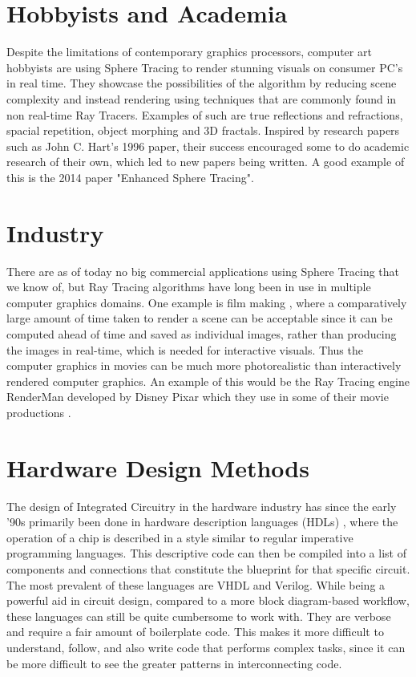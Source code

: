 	\section{ Hobbyists and Academia }

		Despite the limitations of contemporary graphics processors, computer art
		hobbyists are using Sphere Tracing to render stunning visuals on consumer
		PC's in real time. They showcase the possibilities of the algorithm by
		reducing scene complexity and instead rendering using techniques that are
		commonly found in non real-time Ray Tracers. Examples of such are true
		reflections and refractions, spacial repetition, object morphing and 3D
		fractals\cite{InigoQuilez}. Inspired by research papers such as John C.
		Hart's 1996 paper\cite{Hart1996}, their success encouraged some to do
		academic research of their own, which led to new papers being written. A
		good example of this is the 2014 paper "Enhanced Sphere
		Tracing"\cite{Korndorfer2014}.

	\section{ Industry }		

		There are as of today no big commercial applications using Sphere
		Tracing that we know of, but Ray Tracing algorithms have long been in
		use in multiple computer graphics domains. One example is film
		making \cite{Christensen2006}, where a comparatively large amount of
		time taken to render a scene can be acceptable since it can be computed
		ahead of time and saved as individual images, rather than producing
		the images in real-time, which is needed for interactive visuals.
		Thus the computer graphics in movies can be much more photorealistic
		than interactively rendered computer graphics. An example of this
		would be the Ray Tracing engine RenderMan developed by Disney Pixar
		which they use in some of their movie productions \cite{Christensen2006}.

	\section{ Hardware Design Methods } 
	
		The design of Integrated Circuitry in the hardware industry has since
		the early '90s primarily been done in hardware description languages
		(HDLs) \cite{Chen2012}, where the operation of a chip is described in a
		style similar to regular imperative programming languages. This
		descriptive code can then be compiled into a list of components and
		connections that constitute the blueprint for that specific circuit.
		The most prevalent of these languages are VHDL and 
		Verilog\cite{Chen2012}. While being a powerful aid in circuit design,
		compared to a more block diagram-based workflow\cite{Lauwereins},
		these languages can still be quite cumbersome to work with. They are
		verbose and require a fair amount of boilerplate code. This makes it
		more difficult to understand, follow, and also write code that
		performs complex tasks, since it can be more difficult to see the
		greater patterns in interconnecting code.
		
